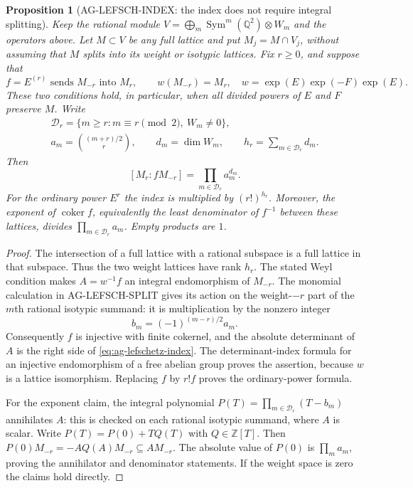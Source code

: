 \documentclass[11pt,a4paper]{article}
\newtheorem{proposition}{Proposition}
\begin{document}
\begin{proposition}[AG-LEFSCH-INDEX: the index does not require integral splitting]
Keep the rational module $V=\bigoplus_m\operatorname{Sym}^m
(\mathbb Q^2)\otimes W_m$ and the operators above. Let
$M\subset V$ be any full lattice and put $M_j=M\cap V_j$,
without assuming that $M$ splits into its weight or isotypic
lattices. Fix $r\ge0$, and suppose that
\[
 f=E^{(r)}\text{ sends }M_{-r}\text{ into }M_r,
 \qquad w(M_{-r})=M_r,
 \quad w=\exp(E)\exp(-F)\exp(E).
\]
These two conditions hold, in particular, when all divided
powers of $E$ and $F$ preserve $M$.
Write
\[
 \begin{gathered}
 \mathcal D_r=\{m\ge r:m\equiv r\pmod2,\ W_m\ne0\},\\
 a_m=\binom{(m+r)/2}{r},\qquad d_m=\dim W_m,
 \qquad h_r=\sum_{m\in\mathcal D_r}d_m.
 \end{gathered}
\]
Then
\begin{equation}\label{eq:ag-lefschetz-index}
 [M_r:fM_{-r}]=\prod_{m\in\mathcal D_r}a_m^{d_m}.
\end{equation}
For the ordinary power $E^r$ the index is multiplied by
$(r!)^{h_r}$. Moreover, the exponent of $\operatorname{coker}f$,
equivalently the least denominator of $f^{-1}$ between these
lattices, divides $\prod_{m\in\mathcal D_r}a_m$.
Empty products are $1$.
\end{proposition}
\begin{proof}
The intersection of a full lattice with a rational subspace
is a full lattice in that subspace. Thus the two weight lattices
have rank $h_r$. The stated Weyl condition makes
$A=w^{-1}f$ an integral endomorphism of $M_{-r}$.
The monomial calculation in AG-LEFSCH-SPLIT gives its action on
the weight-$-r$ part of the $m$th rational isotypic summand:
it is multiplication by the nonzero integer
\[
 b_m=(-1)^{(m-r)/2}a_m.
\]
Consequently $f$ is injective with finite cokernel, and the
absolute determinant of $A$ is the right side of
\eqref{eq:ag-lefschetz-index}. The determinant-index formula
for an injective endomorphism of a free abelian group proves
the assertion, because $w$ is a lattice isomorphism.
Replacing $f$ by $r!f$ proves the ordinary-power formula.

For the exponent claim, the integral polynomial
$P(T)=\prod_{m\in\mathcal D_r}(T-b_m)$ annihilates $A$:
this is checked on each rational isotypic summand, where $A$
is scalar. Write $P(T)=P(0)+TQ(T)$ with $Q\in\mathbb Z[T]$.
Then
$P(0)M_{-r}=-A Q(A)M_{-r}\subseteq A M_{-r}$.
The absolute value of $P(0)$ is $\prod_m a_m$, proving the
annihilator and denominator statements. If the weight space
is zero the claims hold directly.
\end{proof}
\end{document}
